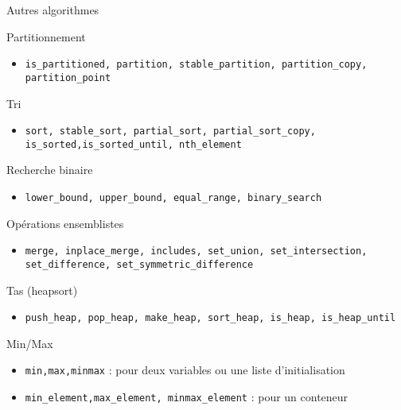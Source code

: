 \documentclass[handout,10pt]{beamer}
\begin{document}
\begin{frame}[fragile]{Autres algorithmes}
 \tiny
 \begin{block}{Partitionnement}
  \begin{itemize}
   \item \lstinline$is_partitioned, partition, stable_partition, partition_copy, partition_point$
  \end{itemize}
 \end{block}

  \begin{block}{Tri}
  \begin{itemize}
   \item \lstinline$sort, stable_sort, partial_sort, partial_sort_copy, is_sorted,is_sorted_until, nth_element$   
  \end{itemize}
  \end{block}

  \begin{block}{Recherche binaire}
   \begin{itemize}
    \item \lstinline$lower_bound, upper_bound, equal_range, binary_search$
   \end{itemize}
  \end{block}

  \begin{block}{Opérations ensemblistes}
   \begin{itemize}
    \item \lstinline$merge, inplace_merge, includes, set_union, set_intersection, set_difference, set_symmetric_difference$
   \end{itemize}
  \end{block}

  \begin{block}{Tas (heapsort)}
   \begin{itemize}
    \item \lstinline$push_heap, pop_heap, make_heap, sort_heap, is_heap, is_heap_until$
   \end{itemize}
  \end{block}

  \begin{block}{Min/Max}
   \begin{itemize}
    \item \lstinline$min,max,minmax$ : pour deux variables ou une liste d'initialisation
    \item \lstinline$min_element,max_element, minmax_element$ : pour un conteneur
   \end{itemize}

  \end{block}  
\end{frame}
\end{document}
